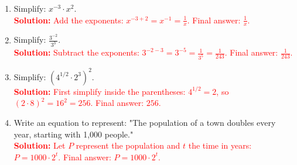 \documentclass[9pt]{article}
\begin{document}
\vspace{1em}
\begin{tcolorbox}[colframe=black!60, colback=white, 
coltitle=black, colbacktitle=black!15, fonttitle=\bfseries\Large, 
title=Exercises (Part 2), halign title=center, left=10pt, right=10pt, top=10pt, bottom=40pt]
\begin{enumerate}[start=6, itemsep=2.5em]
    \item Simplify: \( x^{-3} \cdot x^2 \).\\
    \textcolor{red}{\textbf{Solution:} Add the exponents: \(x^{-3+2} = x^{-1} = \frac{1}{x}\). Final answer: \(\frac{1}{x}\).}

    \item Simplify: \( \frac{3^{-2}}{3^3} \).\\
    \textcolor{red}{\textbf{Solution:} Subtract the exponents: \(3^{-2-3} = 3^{-5} = \frac{1}{3^5} = \frac{1}{243}\). Final answer: \(\frac{1}{243}\).}

    \item Simplify: \( (4^{1/2} \cdot 2^3)^2 \).\\
    \textcolor{red}{\textbf{Solution:} First simplify inside the parentheses: \(4^{1/2} = 2\), so \((2 \cdot 8)^2 = 16^2 = 256\). Final answer: \(256\).}

    \item Write an equation to represent: "The population of a town doubles every year, starting with 1,000 people."\\
    \textcolor{red}{\textbf{Solution:} Let \(P\) represent the population and \(t\) the time in years: \(P = 1000 \cdot 2^t\). Final answer: \(P = 1000 \cdot 2^t\).}
\end{enumerate}
\end{tcolorbox}
\end{document}
